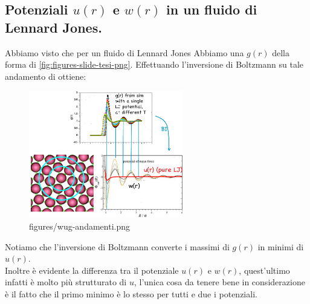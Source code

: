 \subsection{Potenziali $u(r)$ e $w(r)$ in un fluido di Lennard Jones.}
\label{subsec:Potenziali $u(r)$ e $w(r)$ in un fluido di Lennard Jones.}
Abbiamo visto che per un fluido di Lennard Jones Abbiamo una $g(r)$ della forma di \ref{fig:figures-slide-tesi-png}. Effettuando l'inversione di Boltzmann su tale andamento di ottiene:
\begin{figure}[H]
	\centering
	\includegraphics[width=0.6\textwidth]{figures/wug-andamenti.png}
	\caption{figures/wug-andamenti.png}
	\label{fig:figures-wug-andamenti-png}
\end{figure}
\noindent
Notiamo che l'inversione di Boltzmann converte i massimi di $g(r)$ in minimi di $u(r)$.\\
Inoltre è evidente la differenza tra il potenziale $u(r)$ e $w(r)$, quest'ultimo infatti è molto più strutturato di $u$, l'unica cosa da tenere bene in considerazione è il fatto che il primo minimo è lo stesso per tutti e due i potenziali. \\
